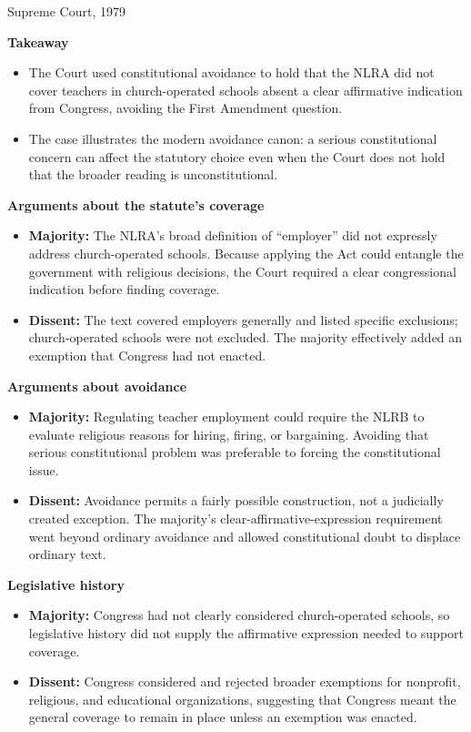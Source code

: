\documentclass[11pt]{tex/lawoutline}
\begin{document}
{Supreme Court, 1979}
{
\textbf{Takeaway}
\begin{itemize}
    \item The Court used constitutional avoidance to hold that the NLRA did not cover teachers in church-operated schools absent a clear affirmative indication from Congress, avoiding the First Amendment question.
    \item The case illustrates the modern avoidance canon: a serious constitutional concern can affect the statutory choice even when the Court does not hold that the broader reading is unconstitutional.
\end{itemize}

\textbf{Arguments about the statute's coverage}
\begin{itemize}
    \item \textbf{Majority:} The NLRA's broad definition of ``employer'' did not expressly address church-operated schools. Because applying the Act could entangle the government with religious decisions, the Court required a clear congressional indication before finding coverage.
    \item \textbf{Dissent:} The text covered employers generally and listed specific exclusions; church-operated schools were not excluded. The majority effectively added an exemption that Congress had not enacted.
\end{itemize}

\textbf{Arguments about avoidance}
\begin{itemize}
    \item \textbf{Majority:} Regulating teacher employment could require the NLRB to evaluate religious reasons for hiring, firing, or bargaining. Avoiding that serious constitutional problem was preferable to forcing the constitutional issue.
    \item \textbf{Dissent:} Avoidance permits a fairly possible construction, not a judicially created exception. The majority's clear-affirmative-expression requirement went beyond ordinary avoidance and allowed constitutional doubt to displace ordinary text.
\end{itemize}

\textbf{Legislative history}
\begin{itemize}
    \item \textbf{Majority:} Congress had not clearly considered church-operated schools, so legislative history did not supply the affirmative expression needed to support coverage.
    \item \textbf{Dissent:} Congress considered and rejected broader exemptions for nonprofit, religious, and educational organizations, suggesting that Congress meant the general coverage to remain in place unless an exemption was enacted.
\end{itemize}
}
\end{document}

